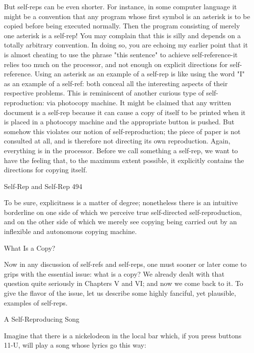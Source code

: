 {        But self-reps can be even shorter. For instance, in some computer language it might
be a convention that any program whose first symbol is an asterisk is to be copied before
being executed normally. Then the program consisting of merely one asterisk is a self-rep!
You may complain that this is silly and depends on a totally arbitrary convention. In doing
so, you are echoing my earlier point that it is almost cheating to use the phrase "this
sentence" to achieve self-reference-it relies too much on the processor, and not enough on
explicit directions for self-reference. Using an asterisk as an example of a self-rep is like
using the word "I" as an example of a self-ref: both conceal all the interesting aspects of their
respective problems.
        This is reminiscent of another curious type of self-reproduction: via photocopy
machine. It might be claimed that any written document is a self-rep because it can cause a
copy of itself to be printed when it is placed in a photocopy machine and the appropriate
button is pushed. But somehow this violates our notion of self-reproduction; the piece of
paper is not consulted at all, and is therefore not directing its own reproduction. Again,
everything is in the processor. Before we call something a self-rep, we want to have the
feeling that, to the maximum extent possible, it explicitly contains the directions for copying
itself.




Self-Rep and Self-Rep                                                                         494

To be sure, explicitness is a matter of degree; nonetheless there is an intuitive borderline on
one side of which we perceive true self-directed self-reproduction, and on the other side of
which we merely see copying being carried out by an inflexible and autonomous copying
machine.

                                      What Is a Copy?

Now in any discussion of self-refs and self-reps, one must sooner or later come to grips with
the essential issue: what is a copy? We already dealt with that question quite seriously in
Chapters V and VI; and now we come back to it. To give the flavor of the issue, let us
describe some highly fanciful, yet plausible, examples of self-reps.

                                  A Self-Reproducing Song

Imagine that there is a nickelodeon in the local bar which, if you press buttons 11-U, will
play a song whose lyrics go this way:

}
